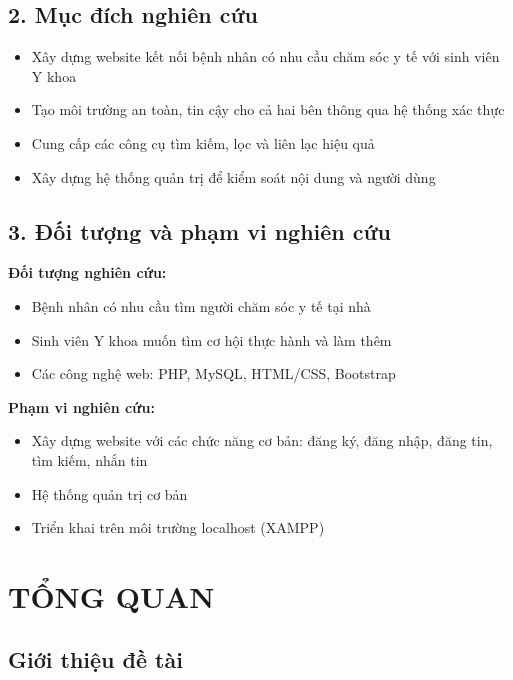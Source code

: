 \documentclass[a4paper,12pt]{report}
\begin{document}
\section*{2. Mục đích nghiên cứu}

\begin{itemize}
    \item Xây dựng website kết nối bệnh nhân có nhu cầu chăm sóc y tế với sinh viên Y khoa
    \item Tạo môi trường an toàn, tin cậy cho cả hai bên thông qua hệ thống xác thực
    \item Cung cấp các công cụ tìm kiếm, lọc và liên lạc hiệu quả
    \item Xây dựng hệ thống quản trị để kiểm soát nội dung và người dùng
\end{itemize}

\section*{3. Đối tượng và phạm vi nghiên cứu}

\textbf{Đối tượng nghiên cứu:}
\begin{itemize}
    \item Bệnh nhân có nhu cầu tìm người chăm sóc y tế tại nhà
    \item Sinh viên Y khoa muốn tìm cơ hội thực hành và làm thêm
    \item Các công nghệ web: PHP, MySQL, HTML/CSS, Bootstrap
\end{itemize}

\textbf{Phạm vi nghiên cứu:}
\begin{itemize}
    \item Xây dựng website với các chức năng cơ bản: đăng ký, đăng nhập, đăng tin, tìm kiếm, nhắn tin
    \item Hệ thống quản trị cơ bản
    \item Triển khai trên môi trường localhost (XAMPP)
\end{itemize}

\chapter{TỔNG QUAN}

\section{Giới thiệu đề tài}
\end{document}
